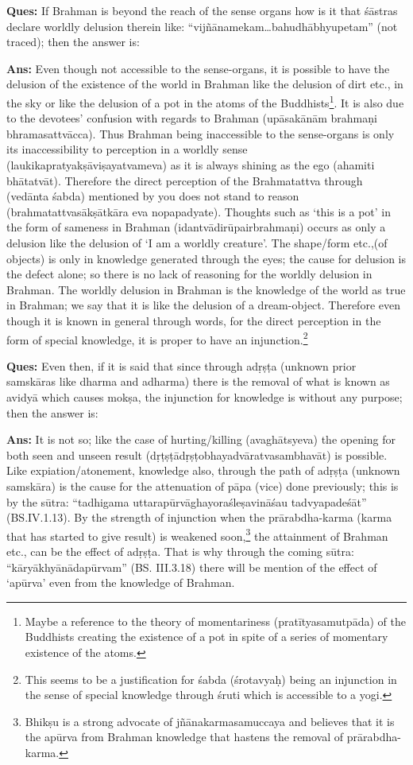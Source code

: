 \textbf{Ques:} If Brahman is beyond the reach of the sense organs how is it that śāstras declare worldly delusion therein like: “vijñānamekam…bahu\-dhābhyupetam” (not traced); then the answer is:

\textbf{Ans:} Even though not accessible to the sense-organs, it is possible to have the delusion of the existence of the world in Brahman like the delusion of dirt etc., in the sky or like the delusion of a pot in the atoms of the Buddhists\footnote{Maybe a reference to the theory of momentariness (pratītyasamutpāda) of the Buddhists creating the existence of a pot in spite of a series of momentary existence of the atoms.}. It is also due to the devotees’ confusion with regards to Brahman (upāsakānām brahmaṇi bhramasattvācca). Thus Brahman being inaccessible to the sense-organs is only its inaccessibility to perception in a worldly sense (laukikapratyakṣāviṣayatvameva) as it is always shining as the ego (ahamiti bhātatvāt). Therefore the direct perception of the Brahmatattva through (vedānta śabda) mentioned by you does not stand to reason (brahmatattvasākṣātkāra eva nopapadyate). Thoughts such as ‘this is a pot’ in the form of sameness in Brahman (idantvādirūpairbrahmaṇi) occurs as only a delusion like the delusion of ‘I am a worldly creature’. The shape/form etc.,(of objects) is only in knowledge generated through the eyes; the cause for delusion is the defect alone; so there is no lack of reasoning for the worldly delusion in Brahman. The worldly delusion in Brahman is the knowledge of the world as true in Brahman; we say that it is like the delusion of a dream-object. Therefore even though it is known in general through words, for the direct perception in the form of special knowledge, it is proper to have an injunction.\footnote{This seems to be a justification for śabda (śrotavyaḥ) being an injunction in the sense of special knowledge through śruti which is accessible to a yogi.}

\textbf{Ques:} Even then, if it is said that since through adṛṣṭa (unknown prior samskāras like dharma and adharma) there is the removal of what is known as avidyā which causes mokṣa, the injunction for knowledge is without any purpose; then the answer is:

\textbf{Ans:} It is not so; like the case of hurting/killing (avaghātsyeva) the opening for both seen and unseen result (dṛṭṣṭādṛṣṭobhayadvāratva\-sambhavāt) is  possible. Like expiation/atonement, knowledge also, through the path of adṛṣṭa (unknown samskāra) is the cause for the attenuation of pāpa (vice) done previously; this is by the sūtra: “tadhigama uttarapūrvāghayoraśleṣavināśau tadvyapadeśāt” (BS.IV.1.13). By the strength of injunction when the prārabdha-karma (karma that has started to give result) is weakened soon,\footnote{Bhikṣu is a strong advocate of jñānakarmasamuccaya and believes that it is the apūrva from Brahman knowledge that hastens the removal of prārabdha-karma.} the attainment of Brahman etc., can be the effect of adṛṣṭa. That is why through the coming sūtra: “kāryākhyānādapūrvam” (BS. III.3.18) there will be mention of the effect of ‘apūrva’ even from the knowledge of Brahman.

